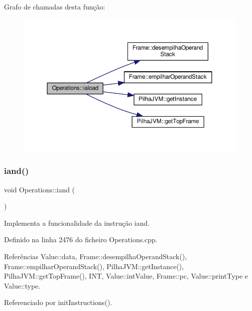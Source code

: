 Grafo de chamadas desta função\+:\nopagebreak
\begin{figure}[H]
\begin{center}
\leavevmode
\includegraphics[width=350pt]{classOperations_a77f3b4c161fee7fbd6bb89b170400c0c_cgraph}
\end{center}
\end{figure}
\mbox{\label{classOperations_a8761c078ea80677ea82a43ab278e76b5}} 
\subsubsection{\texorpdfstring{iand()}{iand()}}
{\footnotesize\ttfamily void Operations\+::iand (\begin{DoxyParamCaption}{ }\end{DoxyParamCaption})\hspace{0.3cm}{\ttfamily [private]}}



Implementa a funcionalidade da instrução iand. 



Definido na linha 2476 do ficheiro Operations.\+cpp.



Referências Value\+::data, Frame\+::desempilha\+Operand\+Stack(), Frame\+::empilhar\+Operand\+Stack(), Pilha\+J\+V\+M\+::get\+Instance(), Pilha\+J\+V\+M\+::get\+Top\+Frame(), I\+NT, Value\+::int\+Value, Frame\+::pc, Value\+::print\+Type e Value\+::type.



Referenciado por init\+Instructions().

